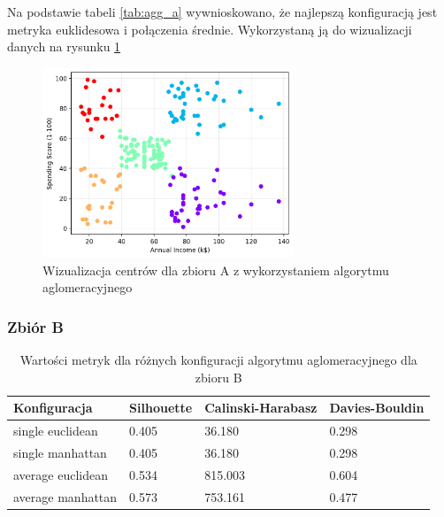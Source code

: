 \documentclass[a4paper,11pt]{article}
\begin{document}
        Na podstawie tabeli \ref{tab:agg_a} wywnioskowano, że najlepszą konfiguracją jest metryka euklidesowa i połączenia średnie. Wykorzystaną ją do wizualizacji danych na rysunku \ref{tab:agg_a_vis}
        
        \begin{figure}[H] %
            \centering
            \includegraphics[width=0.67\textwidth]{images2/agglo/d1.png}
            \caption{Wizualizacja centrów dla zbioru A z wykorzystaniem algorytmu aglomeracyjnego}
            \label{tab:agg_a_vis}
        \end{figure}
    
    \subsubsection*{Zbiór B}
        \begin{table}[H]
            \centering
            \begin{tabular}{|l|l|l|l|}
            \hline
            \textbf{Konfiguracja} & \textbf{Silhouette} & \textbf{Calinski-Harabasz} & \textbf{Davies-Bouldin}    \\ \hline
            single euclidean         & 0.405               & 36.180                     & 0.298                   \\ \hline
            single manhattan         & 0.405               & 36.180                     & 0.298                   \\ \hline
            average euclidean        & 0.534               & 815.003                    & 0.604                   \\ \hline
            average manhattan        & 0.573               & 753.161                    & 0.477                   \\ \hline
            \end{tabular}
            \caption{Wartości metryk dla różnych konfiguracji algorytmu aglomeracyjnego dla zbioru B}
            \label{tab:agg_b}
        \end{table}
        
\end{document}
